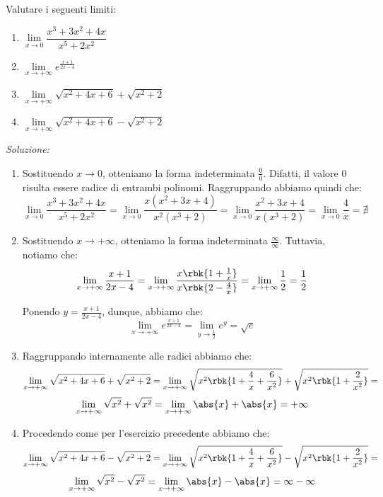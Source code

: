 \documentclass[a4paper, 12pt]{report}
\begin{document}
    \begin{framedprob}{}
        Valutare i seguenti limiti:
        \begin{enumerate}
            \item $\lim\limits_{x \to 0} \dfrac{x^3+3x^2+4x}{x^5+2x^2}$
            \item $\lim\limits_{x \to +\infty} e^{\frac{x+1}{2x-4}}$
            \item $\lim\limits_{x \to +\infty} \sqrt{x^2 + 4x+6} + \sqrt{x^2 +2}$
            \item $\lim\limits_{x \to +\infty} \sqrt{x^2 + 4x+6} - \sqrt{x^2 +2}$
        \end{enumerate}
    \end{framedprob}

    \textit{Soluzione:}
    \begin{enumerate}
        
        \item Sostituendo $x \to 0$, otteniamo la forma indeterminata $\frac{0}{0}$. Difatti, il valore 0 risulta essere radice di entrambi polinomi. Raggruppando abbiamo quindi che:
        \[\lim\limits_{x \to 0} \dfrac{x^3+3x^2+4x}{x^5+2x^2} = \lim\limits_{x \to 0} \dfrac{x(x^2+3x+4)}{x^2(x^3+2)} = \lim\limits_{x \to 0} \dfrac{x^2+3x+4}{x(x^3+2)} = \lim\limits_{x \to 0}\frac{4}{x} = \nexists\]

        \item Sostituendo $x \to +\infty$, otteniamo la forma indeterminata $\frac{\infty}{\infty}$. Tuttavia, notiamo che:
        \[\lim_{x \to +\infty} \frac{x+1}{2x-4} = \lim_{x \to +\infty} \frac{x\rbk{1+\frac{1}{x}}}{x\rbk{2-\frac{4}{x}}} = \lim_{x \to +\infty} \frac{1}{2} = \frac{1}{2}\]

        Ponendo $y = \frac{x+1}{2x-4}$, dunque, abbiamo che:
        \[\lim\limits_{x \to +\infty} e^{\frac{x+1}{2x-4}} = \lim_{y \to \frac{1}{2}} e^y = \sqrt{e}\]

        \item Raggruppando internamente alle radici abbiamo che:
        \[\lim\limits_{x \to +\infty} \sqrt{x^2 + 4x+6} + \sqrt{x^2 +2} = \lim\limits_{x \to +\infty} \sqrt{x^2 \rbk{1+ \frac{4}{x}+\frac{6}{x^2}}} + \sqrt{x^2 \rbk{1+\frac{2}{x^2}}} = \]
        \[\lim\limits_{x \to +\infty} \sqrt{x^2} + \sqrt{x^2} = \lim\limits_{x \to +\infty} \abs{x} + \abs{x} = +\infty\]


        \item Procedendo come per l'esercizio precedente abbiamo che:
        \[\lim\limits_{x \to +\infty} \sqrt{x^2 + 4x+6} - \sqrt{x^2 +2} = \lim\limits_{x \to +\infty} \sqrt{x^2 \rbk{1+ \frac{4}{x}+\frac{6}{x^2}}} - \sqrt{x^2 \rbk{1+\frac{2}{x^2}}} = \]
        \[\lim\limits_{x \to +\infty} \sqrt{x^2} - \sqrt{x^2} = \lim\limits_{x \to +\infty} \abs{x} - \abs{x} = \infty - \infty\]


\end{enumerate}
\end{document}
